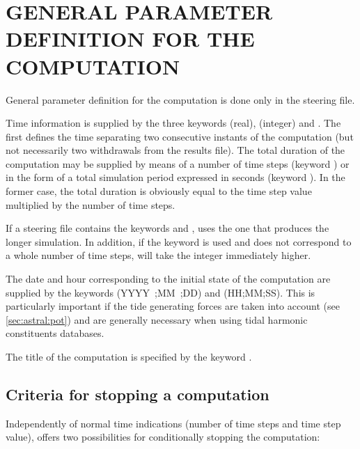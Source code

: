 

\chapter{  GENERAL PARAMETER DEFINITION FOR THE COMPUTATION}
\label{ch:gen:par:def:comp}
 General parameter definition for the computation is done only in the steering file.

 Time information is supplied by the three keywords  (real), (integer) and . The first defines the time separating two consecutive instants of the computation (but not necessarily two withdrawals from the results file). The total duration of the computation may be supplied by means of a number of time steps (keyword ) or in the form of a total simulation period expressed in seconds (keyword ). In the former case, the total duration is obviously equal to the time step value multiplied by the number of time steps.

 If a steering file contains the keywords  and ,  uses the one that produces the longer simulation. In addition, if the keyword  is used and does not correspond to a whole number of time steps,  will take the integer immediately higher.

 The date and hour corresponding to the initial state of the computation are supplied by the keywords  (YYYY~;MM~;DD) and  (HH;MM;SS). This is particularly important if the tide generating forces are taken into account (see \ref{sec:astral:pot}) and are generally necessary when using tidal harmonic constituents databases.

 The title of the computation is specified by the keyword .


\section{Criteria for stopping a computation}

 Independently of normal time indications (number of time steps and time step value),  offers two possibilities for conditionally stopping the computation:

